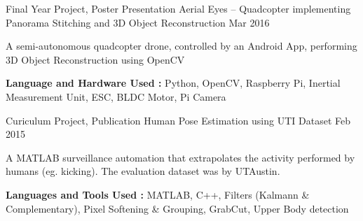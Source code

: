 

\begin{cventries}
  \cventry
    {Final Year Project, Poster Presentation} %
    {Aerial Eyes – Quadcopter implementing Panorama Stitching and 3D Object Reconstruction} %
    {} %
    {Mar 2016} %
    {
      \begin{cvitems}
      \item{A semi-autonomous quadcopter drone, controlled by an Android App, performing 3D Object Reconstruction using OpenCV}
      \item{\textbf{Language and Hardware Used :} Python, OpenCV, Raspberry Pi, Inertial Measurement Unit, ESC, BLDC Motor, Pi Camera}
      \end{cvitems}
    }

  \cventry
    {Curiculum Project, Publication} %
    {Human Pose Estimation using UTI Dataset} %
    {} %
    {Feb 2015} %
    {
      \begin{cvitems}
      \item{A MATLAB surveillance automation that extrapolates the activity performed by humans (eg. kicking). The evaluation dataset was by UTAustin.}
      \item{\textbf{Languages and Tools Used :} MATLAB, C++, Filters (Kalmann \& Complementary), Pixel Softening \& Grouping, GrabCut, Upper Body detection}
      \end{cvitems}
    }


\end{cventries}
